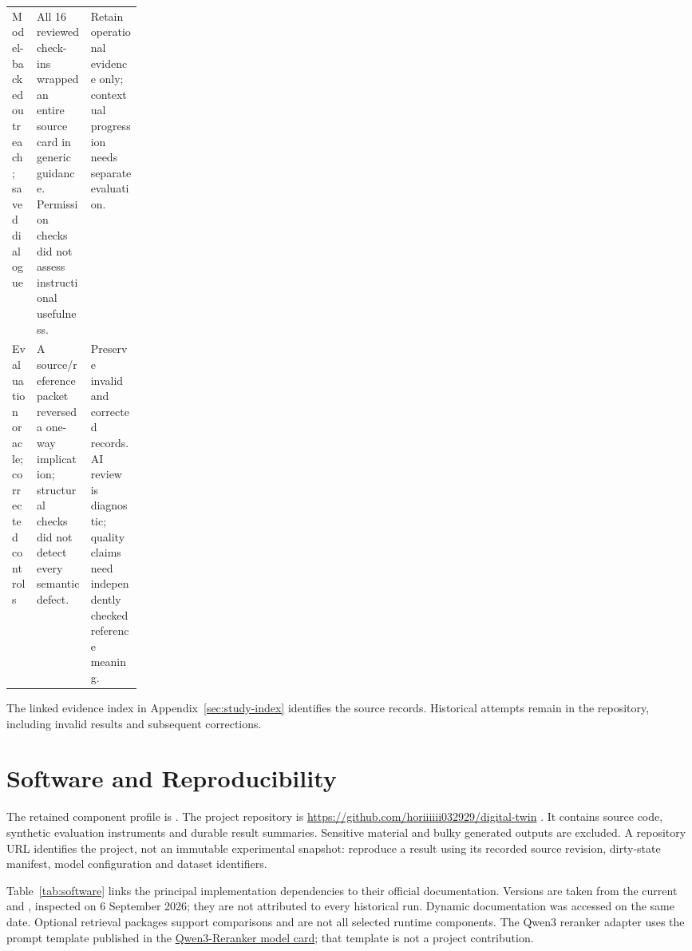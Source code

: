 \begin{table}[htbp]
\begin{tabularx}{\linewidth}{@{}L{0.19\linewidth}Y Y@{}}
Model-backed outreach; saved dialogue & All 16 reviewed check-ins wrapped an entire source card in generic guidance. Permission checks did not assess instructional usefulness. & Retain operational evidence only; contextual progression needs separate evaluation. \\
Evaluation oracle; corrected controls & A source/reference packet reversed a one-way implication; structural checks did not detect every semantic defect. & Preserve invalid and corrected records. AI review is diagnostic; quality claims need independently checked reference meaning. \\
\bottomrule
\end{tabularx}
\end{table}

The linked evidence index in Appendix~\ref{sec:study-index} identifies the
source records. Historical attempts remain in the repository, including
invalid results and subsequent corrections. \clearpage

\clearpage
\section{Software and Reproducibility}
\label{sec:software}
The retained component profile is
.
The project repository is \url{https://github.com/horiiiiii032929/digital-twin}
\cite{horinouchi2026digitaltwin}. It contains source code, synthetic evaluation
instruments and durable result summaries. Sensitive material and bulky generated
outputs are excluded. A repository URL identifies the project, not an immutable
experimental snapshot: reproduce a result using its recorded source revision,
dirty-state manifest, model configuration and dataset identifiers.

Table~\ref{tab:software} links the principal implementation dependencies to their
official documentation. Versions are taken from the current  and
, inspected on 6 September 2026; they are not attributed
to every historical run. Dynamic documentation was accessed on the same date.
Optional retrieval packages support comparisons and are not all selected runtime
components. The Qwen3 reranker adapter uses the prompt template published in the
\href{https://huggingface.co/Qwen/Qwen3-Reranker-0.6B}{Qwen3-Reranker model card};
that template is not a project contribution. 

